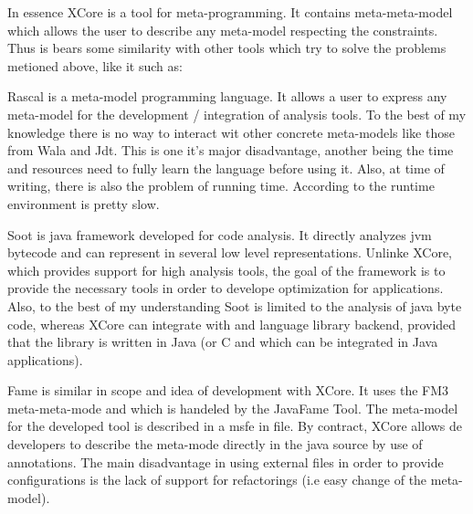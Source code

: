         In essence XCore is a tool for meta-programming. It contains meta-meta-model which allows the user to describe any meta-model respecting the constraints. Thus is bears some similarity
 with other tools which try to solve the problems metioned above, like it such as:
                \begin{description}[labelindent=2cm]
                        \item[Rascal] \cite{tools:rascal}
                        \item[Soot] \cite{tools:soot}
                        \item[Fame] \cite{tools:fame}
                \end{description}
        Rascal is a meta-model programming language. It allows a user to express any meta-model for the development / integration of analysis tools. To the best of my knowledge there is no way
to interact wit other concrete meta-models like those from Wala and Jdt. This is one it's major disadvantage, another being the time and resources need to fully learn the language before using
it. Also, at time of writing, there is also the problem of running time. According to \cite{tools:rascal} the runtime environment is pretty slow.

        Soot is java framework developed for code analysis. It directly analyzes jvm bytecode and can represent in several low level representations. Unlinke XCore, which provides support for 
high analysis tools, the goal of the framework is to provide the necessary tools in order to develope optimization for applications. Also, to the best of my understanding Soot is limited to the
analysis of java byte code, whereas XCore can integrate with and language library backend, provided that the library is written in Java (or C and which can be integrated in Java applications).

        Fame is similar in scope and idea of development with XCore. It uses the FM3 meta-meta-mode \cite{tools:fame} and which is handeled by the JavaFame Tool. The meta-model for the developed
tool is described in a msfe in file. By contract, XCore allows de developers to describe the meta-mode directly in the java source by use of annotations. The main disadvantage in using external
files in order to provide configurations is the lack of support for refactorings (i.e easy change of the meta-model). 


